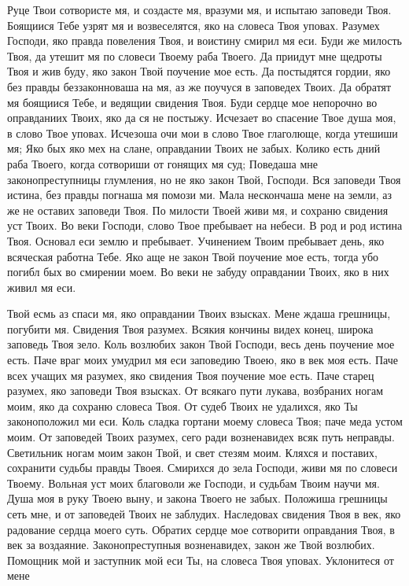    Руце Твои сотвористе мя, и создасте мя, вразуми мя, и испытаю заповеди
Твоя. Боящиися Тебе узрят мя и возвеселятся, яко на словеса Твоя уповах.
Разумех Господи, яко правда повеления Твоя, и воистину смирил мя еси.
Буди же милость Твоя, да утешит мя по словеси Твоему раба Твоего. Да
приидут мне щедроты Твоя и жив буду, яко закон Твой поучение мое есть.
Да постыдятся гордии, яко без правды беззаконноваша на мя, аз же поучуся
в заповедех Твоих. Да обратят мя боящиися Тебе, и ведящии свидения
Твоя. Буди сердце мое непорочно во оправданиих Твоих, яко да ся не
постыжу. Исчезает во спасение Твое душа моя, в слово Твое уповах.
Исчезоша очи мои в слово Твое глаголюще, когда утешиши мя; Яко бых
яко мех на слане, оправдании Твоих не забых. Колико есть дний
раба Твоего, когда сотвориши от гонящих мя суд; Поведаша мне
законопреступницы глумления, но не яко закон Твой, Господи. Вся заповеди
Твоя истина, без правды погнаша мя помози ми. Мала нескончаша
мене на земли, аз же не оставих заповеди Твоя. По милости Твоей
живи мя, и сохраню свидения уст Твоих. Во веки Господи, слово Твое
пребывает на небеси. В род и род истина Твоя. Основал еси землю и
пребывает. Учинением Твоим пребывает день, яко всяческая работна Тебе.
Яко аще не закон Твой поучение мое есть, тогда убо погибл бых во
смирении моем. Во веки не забуду оправдании Твоих, яко в них живил мя
еси.


   Твой есмь аз спаси мя, яко оправдании Твоих взысках. Мене ждаша
грешницы, погубити мя. Свидения Твоя разумех. Всякия кончины видех
конец, широка заповедь Твоя зело. Коль возлюбих закон Твой Господи, весь
день поучение мое есть. Паче враг моих умудрил мя еси заповедию Твоею,
яко в век моя есть. Паче всех учащих мя разумех, яко свидения Твоя
поучение мое есть. Паче старец разумех, яко заповеди Твоя взысках. От
всякаго пути лукава, возбраних ногам моим, яко да сохраню словеса Твоя.
От судеб Твоих не удалихся, яко Ты законоположил ми еси. Коль сладка
гортани моему словеса Твоя; паче меда устом моим. От заповедей Твоих
разумех, сего ради возненавидех всяк путь неправды. Светильник ногам
моим закон Твой, и свет стезям моим. Кляхся и поставих, сохранити
судьбы правды Твоея. Смирихся до зела Господи, живи мя по словеси
Твоему. Вольная уст моих благоволи же Господи, и судьбам Твоим
научи мя. Душа моя в руку Твоею выну, и закона Твоего не забых.
Положиша грешницы сеть мне, и от заповедей Твоих не заблудих.
Наследовах свидения Твоя в век, яко радование сердца моего суть.
Обратих сердце мое сотворити оправдания Твоя, в век за воздаяние.
Законопреступныя возненавидех, закон же Твой возлюбих. Помощник мой и
заступник мой еси Ты, на словеса Твоя уповах. Уклонитеся от мене

